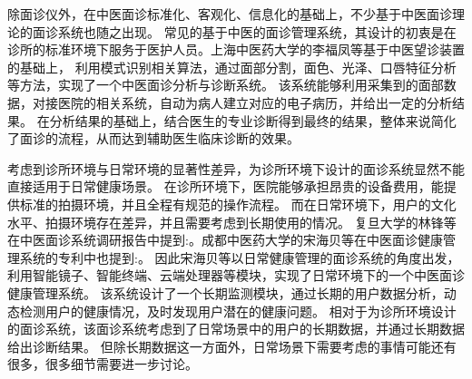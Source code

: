 除面诊仪外，在中医面诊标准化、客观化、信息化的基础上，不少基于中医面诊理论的面诊系统也随之出现。
常见的基于中医的面诊管理系统，其设计的初衷是在诊所的标准环境下服务于医护人员。上海中医药大学的李福凤等基于中医望诊装置\cite{李国正0一种用于中医望诊的三维图像采集装置}的基础上，
利用模式识别相关算法，通过面部分割，面色、光泽、口唇特征分析等方法，实现了一个中医面诊分析与诊断系统\cite{李福凤2016中医面诊分析与诊断系统}。
该系统能够利用采集到的面部数据，对接医院的相关系统，自动为病人建立对应的电子病历，并给出一定的分析结果。
在分析结果的基础上，结合医生的专业诊断得到最终的结果，整体来说简化了面诊的流程，从而达到辅助医生临床诊断的效果。

考虑到诊所环境与日常环境的显著性差异，为诊所环境下设计的面诊系统显然不能直接适用于日常健康场景。
在诊所环境下，医院能够承担昂贵的设备费用，能提供标准的拍摄环境，并且全程有规范的操作流程。
而在日常环境下，用户的文化水平、拍摄环境存在差异，并且需要考虑到长期使用的情况。
复旦大学的林锋等在中医面诊系统调研报告\cite{林锋2019中医面诊系统调研报告}中提到:。成都中医药大学的宋海贝等在中医面诊健康管理系统的专利\cite{宋海贝2019中医面诊健康管理系统}中也提到:。
因此宋海贝等以日常健康管理的面诊系统的角度出发，利用智能镜子、智能终端、云端处理器等模块，实现了日常环境下的一个中医面诊健康管理系统。
该系统设计了一个长期监测模块，通过长期的用户数据分析，动态检测用户的健康情况，及时发现用户潜在的健康问题。
相对于为诊所环境设计的面诊系统，该面诊系统考虑到了日常场景中的用户的长期数据，并通过长期数据给出诊断结果。
但除长期数据这一方面外，日常场景下需要考虑的事情可能还有很多，很多细节需要进一步讨论。

